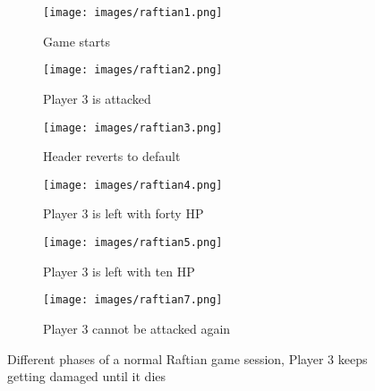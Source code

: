 \begin{figure}[h]
    \centering
    \begin{subfigure}{0.31\textwidth}
        \texttt{[image: images/raftian1.png]}
        \caption{Game starts}
    \end{subfigure}
    \hfill
    \begin{subfigure}{0.31\textwidth}
        \texttt{[image: images/raftian2.png]}
        \caption{Player 3 is attacked}
    \end{subfigure}
    \hfill
    \begin{subfigure}{0.31\textwidth}
        \texttt{[image: images/raftian3.png]}
        \caption{Header reverts to default}
    \end{subfigure}
    \hfill
    \begin{subfigure}{0.31\textwidth}
        \texttt{[image: images/raftian4.png]}
        \caption{Player 3 is left with forty HP}
    \end{subfigure}
    \hfill
    \begin{subfigure}{0.31\textwidth}
        \texttt{[image: images/raftian5.png]}
        \caption{Player 3 is left with ten HP}
    \end{subfigure}
    \hfill
    \begin{subfigure}{0.31\textwidth}
        \texttt{[image: images/raftian7.png]}
        \caption{Player 3 cannot be attacked again}
    \end{subfigure}

    \caption{Different phases of a normal Raftian game session, Player 3 keeps getting damaged until it dies}
    \label{fig:raftianUI}
\end{figure}
